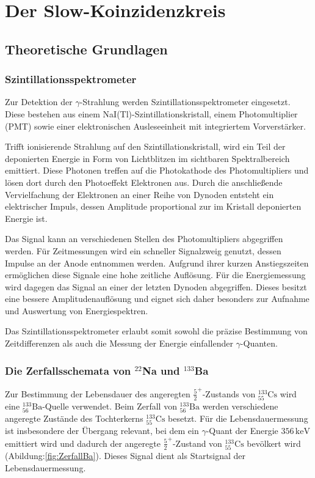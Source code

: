 \chapter{Der Slow-Koinzidenzkreis}
\section{Theoretische Grundlagen}
\subsection{Szintillationsspektrometer}

Zur Detektion der $\gamma$-Strahlung werden Szintillationsspektrometer eingesetzt. 
Diese bestehen aus einem NaI(Tl)-Szintillationskristall, einem Photomultiplier (PMT) sowie einer elektronischen Ausleseeinheit mit integriertem Vorverstärker.

Trifft ionisierende Strahlung auf den Szintillationskristall, wird ein Teil der deponierten Energie in Form von Lichtblitzen im sichtbaren Spektralbereich emittiert. 
Diese Photonen treffen auf die Photokathode des Photomultipliers und lösen dort durch den Photoeffekt Elektronen aus. 
Durch die anschließende Vervielfachung der Elektronen an einer Reihe von Dynoden entsteht ein elektrischer Impuls, dessen Amplitude proportional zur im Kristall deponierten Energie ist.

Das Signal kann an verschiedenen Stellen des Photomultipliers abgegriffen werden. 
Für Zeitmessungen wird ein schneller Signalzweig genutzt, dessen Impulse an der Anode entnommen werden. 
Aufgrund ihrer kurzen Anstiegszeiten ermöglichen diese Signale eine hohe zeitliche Auflösung. 
Für die Energiemessung wird dagegen das Signal an einer der letzten Dynoden abgegriffen. 
Dieses besitzt eine bessere Amplitudenauflösung und eignet sich daher besonders zur Aufnahme und Auswertung von Energiespektren.

Das Szintillationsspektrometer erlaubt somit sowohl die präzise Bestimmung von Zeitdifferenzen als auch die Messung der Energie einfallender $\gamma$-Quanten.

\subsection{Die Zerfallsschemata von $^{22}$Na und $^{133}$Ba}

Zur Bestimmung der Lebensdauer des angeregten $\frac{5}{2}^{+}$-Zustands von $^{133}_{55}\mathrm{Cs}$ wird eine $^{133}_{56}\mathrm{Ba}$-Quelle verwendet. 
Beim Zerfall von $^{133}_{56}\mathrm{Ba}$ werden verschiedene angeregte Zustände des Tochterkerns $^{133}_{55}\mathrm{Cs}$ besetzt. 
Für die Lebensdauermessung ist insbesondere der Übergang relevant, bei dem ein $\gamma$-Quant der Energie $356\,\mathrm{keV}$ emittiert wird und dadurch der angeregte $\frac{5}{2}^{+}$-Zustand von $^{133}_{55}\mathrm{Cs}$ bevölkert wird (Abildung:\ref{fig:ZerfallBa}). 
Dieses Signal dient als Startsignal der Lebensdauermessung.


